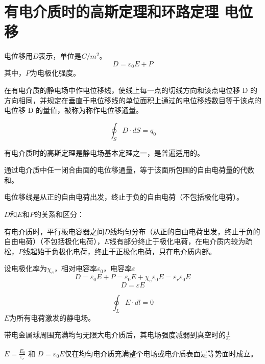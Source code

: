 
	
	
	\section{有电介质时的高斯定理和环路定理  电位移}
	
	
	\begin{definition}[电位移]
		电位移用$D$表示，单位是$C/m^2$。
		$$D = \varepsilon_{0}E + P$$
		其中，$P$为电极化强度。
	\end{definition}
	
\begin{definition}[电位移通量]
在有电介质的静电场中作电位移线，使线上每一点的切线方向和该点电位移 D 的方向相同，并规定在垂直于电位移线的单位面积上通过的电位移线数目等于该点的电位移 D 的量值，被称为称作电位移通量。
\end{definition}
	
	\begin{definition}[有电介质时的高斯定理]
		$$\oint_{S} D \cdot dS = q_{0}$$
	\end{definition}
	
\begin{note}
有电介质时的高斯定理是静电场基本定理之一，是普遍适用的。
	
通过电介质中任一闭合曲面的电位移通量，等于该面所包围的自由电荷量的代数和。

电位移线是从正的自由电荷出发，终止于负的自由电荷（不包括极化电荷）。

\end{note}
	
	
\begin{note}
$D$和$E$和$P$的关系和区分：

有电介质时，平行板电容器之间$D$线均匀分布（从正的自由电荷出发，终止于负的自由电荷）（不包括极化电荷），$E$线有部分终止于极化电荷，在电介质内较为疏松，$P$线起始于负极化电荷，终止于正极化电荷，只在电介质内部。

设电极化率为$\chi_{e}$，相对电容率$\varepsilon_{0}$，电容率$\varepsilon$
$$D = \varepsilon_{0}E + P = \varepsilon_{0}E + \chi_{e}\varepsilon_{0}E = \varepsilon_{r}\varepsilon_{0}E$$
	$$D = \varepsilon E$$
		
\end{note}
	
	\begin{definition}[有电介质时的环路定理]
$$\oint_{L} E \cdot dl = 0$$
$E$为所有电荷激发的静电场。
	\end{definition}
\begin{supplement}
带电金属球周围充满均匀无限大电介质后，其电场强度减弱到真空时的$\frac{1}{\varepsilon_{r}}$
\end{supplement}

\begin{supplement}
$E = \frac{E_{0} }{\varepsilon_{r}}$ 和 $D = \varepsilon_{0}E $仅在均匀电介质充满整个电场或电介质表面是等势面时成立。
\end{supplement}
	

	
